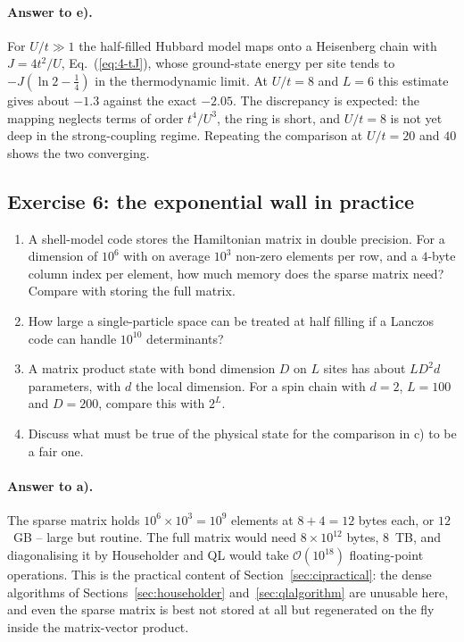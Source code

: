 \paragraph{Answer to e).}
For $U/t\gg1$ the half-filled Hubbard model maps onto a Heisenberg chain with
$J=4t^2/U$, Eq.~(\ref{eq:4-tJ}), whose ground-state energy per site tends to
$-J(\ln 2-\tfrac14)$ in the thermodynamic limit.  At $U/t=8$ and $L=6$ this
estimate gives about $-1.3$ against the exact $-2.05$.  The discrepancy is
expected: the mapping neglects terms of order $t^4/U^3$, the ring is short, and
$U/t=8$ is not yet deep in the strong-coupling regime.  Repeating the
comparison at $U/t=20$ and $40$ shows the two converging.

\subsection*{Exercise 6: the exponential wall in practice}
\label{ex:5-wall}

\begin{enumerate}
  \item[a)] A shell-model code stores the Hamiltonian matrix in double
  precision.  For a dimension of $10^6$ with on average $10^3$ non-zero
  elements per row, and a $4$-byte column index per element, how much memory
  does the sparse matrix need?  Compare with storing the full matrix.
  \item[b)] How large a single-particle space can be treated at half filling
  if a Lanczos code can handle $10^{10}$ determinants?
  \item[c)] A matrix product state with bond dimension $D$ on $L$ sites has
  about $LD^2d$ parameters, with $d$ the local dimension.  For a spin chain
  with $d=2$, $L=100$ and $D=200$, compare this with $2^{L}$.
  \item[d)] Discuss what must be true of the physical state for the comparison
  in c) to be a fair one.
\end{enumerate}

\paragraph{Answer to a).}
The sparse matrix holds $10^{6}\times10^{3}=10^{9}$ elements at $8+4=12$ bytes
each, or $12$~GB -- large but routine.  The full matrix would need
$8\times10^{12}$ bytes, $8$~TB, and diagonalising it by Householder and QL
would take $\mathcal{O}(10^{18})$ floating-point operations.  This is the
practical content of Section~\ref{sec:cipractical}: the dense algorithms of
Sections~\ref{sec:householder} and~\ref{sec:qlalgorithm} are unusable here,
and even the sparse matrix is best not stored at all but regenerated on the
fly inside the matrix-vector product.

